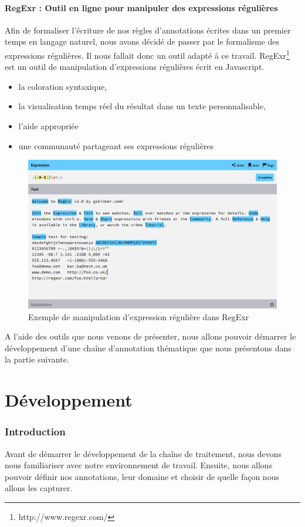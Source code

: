 \documentclass[a4paper, 11pt]{report}
\begin{document}
\subsection{RegExr : Outil en ligne pour manipuler des expressions régulières}
Afin de formaliser l'écriture de nos règles d'annotations écrites dans un premier temps en langage naturel, nous avons décidé de passer par le formalisme des expressions régulières. Il nous fallait donc un outil adapté à ce travail. 
RegExr\footnote{http://www.regexr.com/} est un outil de manipulation d’expressions régulières écrit en Javascript.\\
\begin{itemize}
\item la coloration syntaxique,
\item la visualisation temps réel du résultat dans un texte personnalisable,
\item l'aide appropriée
\item une communauté partageant ses expressions régulières
\end{itemize}
\begin{figure}[h]
\begin{center}
\includegraphics[scale=0.3]{img/regexr.png} 
\end{center}
\caption{Exemple de manipulation d'expression régulière dans RegExr}
\end{figure}

A l'aide des outils que nous venons de présenter, nous allons pouvoir démarrer le développement d'une chaîne d'annotation thématique que nous présentons dans la partie suivante.
\part{Développement}
    \section*{Introduction}
    Avant de démarrer le développement de la chaîne de traitement, nous devons nous familiariser avec notre environnement de travail. Ensuite, nous allons pouvoir définir nos annotations, leur domaine et choisir de quelle façon nous allons les capturer.
\end{document}
